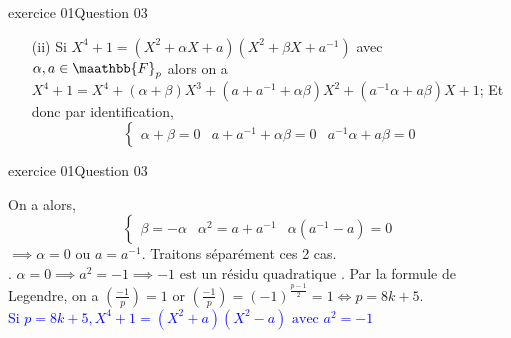 \documentclass[10pt]{beamer}
\begin{document}
    \begin{frame}{exercice 01}{Question 03}
        \begin{exampleblock}{}
            \begin{itemize}
                \item [(ii)] Si $X^4 + 1 = (X^2 + \alpha X + a)(X^2 + \beta X + a^{-1})$ avec $\alpha, a \in \maathbb{F}_{p}$ alors on a
                $X^4 + 1  = X^4 + (\alpha + \beta)X^3 + (a + a^{-1} + \alpha\beta)X^2 + (a^{-1}\alpha + a\beta)X + 1$;\pause 
                Et donc par identification, 
                \[
                    \left\{
                    \begin{array}{}
                        \alpha + \beta = 0 &
                        a + a^{-1} + \alpha\beta = 0 & 
                        a^{-1}\alpha + a\beta = 0
                    \end{array}
                    \right.
                \]
            \end{itemize}
             
        \end{exampleblock}
    \end{frame}

    \begin{frame}{exercice 01}{Question 03}
        \begin{exampleblock}{}
            On a alors,
            \[
                \left\{
                \begin{array}{}
                    \beta = -\alpha &
                    \alpha^2 = a + a^{-1} & 
                    \alpha(a^{-1} - a) = 0
                \end{array}
                \right.
            \] \pause
            $\implies \alpha = 0 \text{ ou } a = a^{-1}$. Traitons séparément ces 2 cas.\\ . $\alpha = 0 \implies a^{2} = -1 \implies -1 \text{ est un résidu quadratique }$. Par la formule de Legendre, on a $(\frac{-1}{p}) = 1$
            or $(\frac{-1}{p}) = (-1)^\frac{p-1}{2} = 1 \Leftrightarrow p = 8k + 5$.\\ \pause
            \textcolor{blue}{Si $p=8k+5, X^4 + 1 = (X^2 + a)(X^2 - a) \text{ avec } a^2 = -1$}
            
        \end{exampleblock}
    \end{frame}
\end{document}
